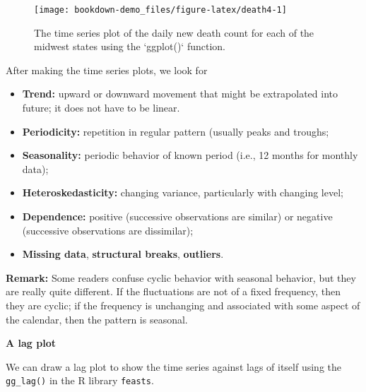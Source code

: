 \documentclass[]{book}
\newenvironment{Shaded}{\begin{snugshade}}{\end{snugshade}}
\newcommand{\KeywordTok}[1]{\textcolor[rgb]{0.13,0.29,0.53}{\textbf{#1}}}
\newcommand{\DataTypeTok}[1]{\textcolor[rgb]{0.13,0.29,0.53}{#1}}
\newcommand{\StringTok}[1]{\textcolor[rgb]{0.31,0.60,0.02}{#1}}
\newcommand{\OperatorTok}[1]{\textcolor[rgb]{0.81,0.36,0.00}{\textbf{#1}}}
\newcommand{\NormalTok}[1]{#1}
\begin{document}
\begin{figure}

{\centering \texttt{[image: bookdown-demo\_files/figure-latex/death4-1]} 

}

\caption{The time series plot of the daily new death count for each of the midwest states using the `ggplot()` function.}\label{fig:death4}
\end{figure}

After making the time series plots, we look for

\begin{itemize}
\item
  \textbf{Trend:} upward or downward movement that might be extrapolated
  into future; it does not have to be linear.
\item
  \textbf{Periodicity:} repetition in regular pattern (usually peaks and
  troughs;
\item
  \textbf{Seasonality:} periodic behavior of known period (i.e., 12
  months for monthly data);
\item
  \textbf{Heteroskedasticity:} changing variance, particularly with
  changing level;
\item
  \textbf{Dependence:} positive (successive observations are similar) or
  negative (successive observations are dissimilar);
\item
  \textbf{Missing data}, \textbf{structural breaks}, \textbf{outliers}.
\end{itemize}

\textbf{Remark:} Some readers confuse cyclic behavior with seasonal
behavior, but they are really quite different. If the fluctuations are
not of a fixed frequency, then they are cyclic; if the frequency is
unchanging and associated with some aspect of the calendar, then the
pattern is seasonal.

\textbf{A lag plot}

We can draw a lag plot to show the time series against lags of itself
using the \texttt{gg\_lag()} in the R library \texttt{feasts}.

\begin{Shaded}
\end{Shaded}
\end{document}
